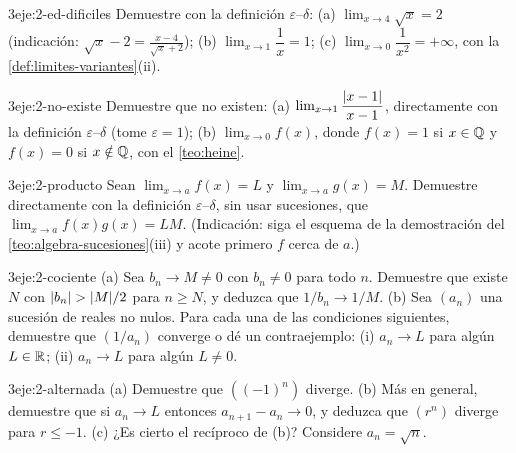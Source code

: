 \begin{ejercicio}{3}{eje:2-ed-dificiles}
Demuestre con la definición $\varepsilon$--$\delta$: (a) $\lim_{x\to4}\sqrt{x}=2$ (indicación: $\sqrt x-2=\frac{x-4}{\sqrt x+2}$); (b) $\lim_{x\to1}\dfrac1x=1$; (c) $\lim_{x\to0}\dfrac{1}{x^{2}}=+\infty$, con la \cref{def:limites-variantes}(ii).
\end{ejercicio}

\begin{ejercicio}{3}{eje:2-no-existe}
Demuestre que no existen: (a) $\lim_{x\to1}\dfrac{\lvert x-1\rvert}{x-1}$, directamente con la definición $\varepsilon$--$\delta$ (tome $\varepsilon=1$); (b) $\lim_{x\to0}f(x)$, donde $f(x)=1$ si $x\in\mathbb{Q}$ y $f(x)=0$ si $x\notin\mathbb{Q}$, con el \cref{teo:heine}.
\end{ejercicio}

\begin{ejercicio}{3}{eje:2-producto}
Sean $\lim_{x\to a}f(x)=L$ y $\lim_{x\to a}g(x)=M$. Demuestre directamente con la definición $\varepsilon$--$\delta$, sin usar sucesiones, que $\lim_{x\to a}f(x)g(x)=LM$. (Indicación: siga el esquema de la demostración del \cref{teo:algebra-sucesiones}(iii) y acote primero $f$ cerca de $a$.)
\end{ejercicio}

\begin{ejercicio}{3}{eje:2-cociente}
(a) Sea $b_n\to M\ne0$ con $b_n\ne0$ para todo $n$. Demuestre que existe $N$ con $\lvert b_n\rvert>\lvert M\rvert/2$ para $n\ge N$, y deduzca que $1/b_n\to1/M$. (b) Sea $(a_n)$ una sucesión de reales no nulos. Para cada una de las condiciones siguientes, demuestre que $(1/a_n)$ converge o dé un contraejemplo: (i) $a_n\to L$ para algún $L\in\mathbb{R}$; (ii) $a_n\to L$ para algún $L\ne0$.
\end{ejercicio}

\begin{ejercicio}{3}{eje:2-alternada}
(a) Demuestre que $((-1)^{n})$ diverge. (b) Más en general, demuestre que si $a_n\to L$ entonces $a_{n+1}-a_n\to0$, y deduzca que $(r^{n})$ diverge para $r\le-1$. (c) ¿Es cierto el recíproco de (b)? Considere $a_n=\sqrt n$.
\end{ejercicio}

